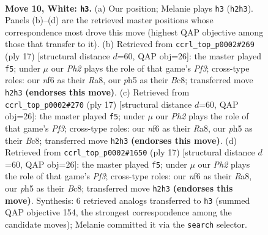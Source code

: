 \documentclass[11pt]{article}
\begin{document}
\clearpage

\begin{figure}[p]\centering
\begin{subfigure}{0.46\textwidth}\centering
\resizebox{\linewidth}{!}{%
\newchessgame
\chessboard[
  setfen={r1b1k2r/ppp1qpp1/2n2n2/3p3p/3P4/2B2NP1/PP1KPP1P/R2Q1B1R w kq - 0 10},
  showmover=false,
  pgfstyle=straightmove, color=movearrow, markmove={h2-h3}
]}
\caption{}
\end{subfigure}\hfill
\begin{subfigure}{0.46\textwidth}\centering
\resizebox{\linewidth}{!}{%
\newchessgame
\chessboard[
  setfen={r1bqkb1r/1p3p1p/p1np1p2/4p3/4P3/N1N5/PPP2PPP/R2QKB1R b KQkq - 1 9},
  showmover=false,
  pgfstyle=straightmove, color=movearrow, markmove={f6-f5}
]}
\caption{}
\end{subfigure}
\\[4pt]
\begin{subfigure}{0.46\textwidth}\centering
\resizebox{\linewidth}{!}{%
\newchessgame
\chessboard[
  setfen={r1bqkb1r/1p3p1p/p1np1p2/4p3/4P3/N1N5/PPP2PPP/R2QKB1R b KQkq - 1 9},
  showmover=false,
  pgfstyle=straightmove, color=movearrow, markmove={f6-f5}
]}
\caption{}
\end{subfigure}\hfill
\begin{subfigure}{0.46\textwidth}\centering
\resizebox{\linewidth}{!}{%
\newchessgame
\chessboard[
  setfen={r1bqkb1r/1p3p1p/p1np1p2/4p3/4P3/N1N5/PPP2PPP/R2QKB1R b KQkq - 1 9},
  showmover=false,
  pgfstyle=straightmove, color=movearrow, markmove={f6-f5}
]}
\caption{}
\end{subfigure}
\caption{\textbf{Move 10, White: \texttt{h3}.} (a) Our position; Melanie plays \texttt{h3} (\texttt{h2h3}). Panels (b)--(d) are the retrieved master positions whose correspondence most drove this move (highest QAP objective among those that transfer to it). (b) Retrieved from \texttt{ccrl\_top\_p0002\#269} (ply 17) [structural distance $d$=60, QAP obj=26]: the master played \texttt{f5}; under $\mu$ our \emph{Ph2} plays the role of that game's \emph{Pf3}; cross-type roles: our \emph{n}f6 as their \emph{R}a8, our \emph{p}h5 as their \emph{B}c8; transferred move \texttt{h2h3} \textbf{(endorses this move)}. (c) Retrieved from \texttt{ccrl\_top\_p0002\#270} (ply 17) [structural distance $d$=60, QAP obj=26]: the master played \texttt{f5}; under $\mu$ our \emph{Ph2} plays the role of that game's \emph{Pf3}; cross-type roles: our \emph{n}f6 as their \emph{R}a8, our \emph{p}h5 as their \emph{B}c8; transferred move \texttt{h2h3} \textbf{(endorses this move)}. (d) Retrieved from \texttt{ccrl\_top\_p0002\#1650} (ply 17) [structural distance $d$=60, QAP obj=26]: the master played \texttt{f5}; under $\mu$ our \emph{Ph2} plays the role of that game's \emph{Pf3}; cross-type roles: our \emph{n}f6 as their \emph{R}a8, our \emph{p}h5 as their \emph{B}c8; transferred move \texttt{h2h3} \textbf{(endorses this move)}. Synthesis: 6 retrieved analogs transferred to \texttt{h3} (summed QAP objective 154, the strongest correspondence among the candidate moves); Melanie committed it via the \texttt{search} selector.}
\label{fig:thought-m18}
\end{figure}
\end{document}
